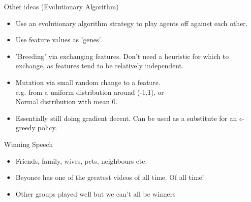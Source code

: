 \documentclass{beamer}
\begin{document}
\begin{frame}{Other ideas (Evolutionary Algorithm)}
    \begin{itemize}
  \item
   	Use an evolutionary algorithm strategy to play agents off against each other.
  \item
	Use feature values as 'genes'.
  \item
	'Breeding' via exchanging features. Don't need a heuristic for which to exchange, as features tend to be relatively independent.
  \item
	Mutation via small random change to a feature.
	\\ e.g. from a uniform distribution around (-1,1), or
	\\ Normal distribution with mean 0.
  \item
	Essentially still doing gradient decent. Can be used as a substitute for an $\epsilon$-greedy policy.
  \end{itemize}
\end{frame}

\begin{frame}{Winning Speech}
    \begin{itemize}
  \item
    Friends, family, wives, pets, neighbours etc.
  \item
   Beyonce has one of the greatest videos of all time. Of all time!
  \item
   Other groups played well but we can't all be winners
  \end{itemize}
\end{frame}
\end{document}
